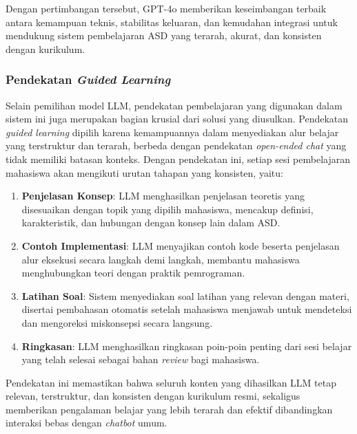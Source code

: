 Dengan pertimbangan tersebut, GPT-4o memberikan keseimbangan terbaik antara kemampuan teknis, stabilitas keluaran, dan kemudahan integrasi untuk mendukung sistem pembelajaran ASD yang terarah, akurat, dan konsisten dengan kurikulum.

\subsubsection{Pendekatan \textit{Guided Learning}}

Selain pemilihan model LLM, pendekatan pembelajaran yang digunakan dalam sistem ini juga merupakan bagian krusial dari solusi yang diusulkan. Pendekatan \textit{guided learning} dipilih karena kemampuannya dalam menyediakan alur belajar yang terstruktur dan terarah, berbeda dengan pendekatan \textit{open-ended chat} yang tidak memiliki batasan konteks. Dengan pendekatan ini, setiap sesi pembelajaran mahasiswa akan mengikuti urutan tahapan yang konsisten, yaitu:

\begin{enumerate}
    \item \textbf{Penjelasan Konsep}: LLM menghasilkan penjelasan teoretis yang disesuaikan dengan topik yang dipilih mahasiswa, mencakup definisi, karakteristik, dan hubungan dengan konsep lain dalam ASD.

    \item \textbf{Contoh Implementasi}: LLM menyajikan contoh kode beserta penjelasan alur eksekusi secara langkah demi langkah, membantu mahasiswa menghubungkan teori dengan praktik pemrograman.

    \item \textbf{Latihan Soal}: Sistem menyediakan soal latihan yang relevan dengan materi, disertai pembahasan otomatis setelah mahasiswa menjawab untuk mendeteksi dan mengoreksi miskonsepsi secara langsung.

    \item \textbf{Ringkasan}: LLM menghasilkan ringkasan poin-poin penting dari sesi belajar yang telah selesai sebagai bahan \textit{review} bagi mahasiswa.
\end{enumerate}

Pendekatan ini memastikan bahwa seluruh konten yang dihasilkan LLM tetap relevan, terstruktur, dan konsisten dengan kurikulum resmi, sekaligus memberikan pengalaman belajar yang lebih terarah dan efektif dibandingkan interaksi bebas dengan \textit{chatbot} umum.
